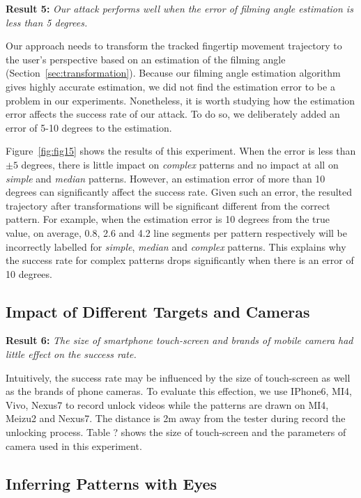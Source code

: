     \noindent \textbf{Result 5:} \emph{Our attack performs well when the error of filming angle estimation is less than 5 degrees.}

   Our approach needs to transform the tracked fingertip movement trajectory to the
   user's perspective based on an estimation of the filming angle
   (Section~\ref{sec:transformation}).
   Because our filming angle estimation
    algorithm gives highly accurate estimation, we did not find the estimation error to be a problem in our experiments.
   Nonetheless, it is worth studying how the estimation error affects the success rate of our attack. To do so, we deliberately added an error of 5-10 degrees to the estimation.

    Figure~\ref{fig:fig15} shows the results of this experiment. When the error is less than $\pm 5$ degrees, there is little impact
    on \emph{complex} patterns and no impact at all on \emph{simple} and
    \emph{median} patterns. However, an estimation error of more than 10 degrees can significantly affect the success rate.
    Given such an error, the resulted trajectory after transformations will
    be significant different from the correct pattern.
    For example, when the estimation error is 10 degrees from the
    true value,  on average, 0.8, 2.6 and 4.2 line segments per pattern respectively will
    be incorrectly labelled for \emph{simple}, \emph{median} and
    \emph{complex} patterns. This explains why the success rate for complex patterns drops significantly when there is
    an error of 10 degrees.

    \subsection{Impact of Different Targets and Cameras}
    \noindent \textbf{Result 6:} \emph{The size of smartphone touch-screen and brands of mobile camera had little effect on the success rate.}
    
    Intuitively, the success rate may be influenced by the size of touch-screen as well as the brands of phone cameras. To evaluate this effection, we use IPhone6, MI4, Vivo, Nexus7 to record unlock videos while the patterns are drawn on MI4, Meizu2 and Nexus7.  The distance is 2m away from the tester during record the unlocking process. Table ? shows the size of touch-screen and the parameters of camera used in this experiment.
    
    \subsection{Inferring Patterns with Eyes}


